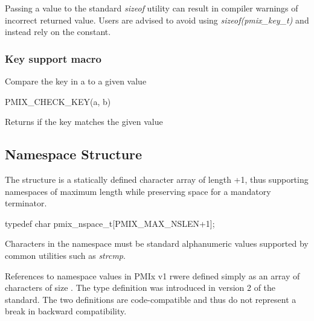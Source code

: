 Passing a  value to the standard \textit{sizeof} utility can result in compiler warnings of incorrect returned value. Users are advised to avoid using \textit{sizeof(pmix_key_t)} and instead rely on the  constant.
\adviceuserend

\subsubsection{Key support macro}

Compare the key in a  to a given value

\cspecificstart
\begin{codepar}
PMIX_CHECK_KEY(a, b)
\end{codepar}
\cspecificend

\begin{arglist}
\end{arglist}

Returns  if the key matches the given value

\subsection{Namespace Structure}

The  structure is a statically defined character array of length +1, thus supporting namespaces of maximum length  while preserving space for a mandatory  terminator.

\cspecificstart
\begin{codepar}
typedef char pmix_nspace_t[PMIX_MAX_NSLEN+1];
\end{codepar}
\cspecificend

Characters in the namespace must be standard alphanumeric values supported by common utilities such as \textit{strcmp}.

\adviceuserstart
References to namespace values in \ac{PMIx} v1 rwere defined simply as an array of characters of size . The  type definition was introduced in version 2 of the standard. The two definitions are code-compatible and thus do not represent a break in backward compatibility.

